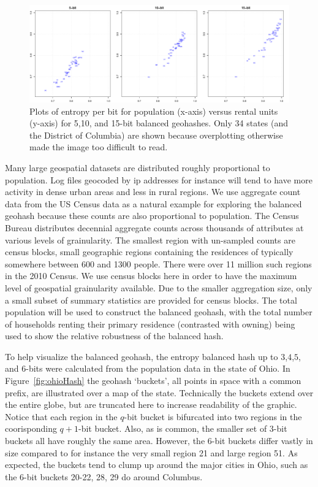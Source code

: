 \documentclass[nips13submit_09,times,art10]{article} %
\begin{document}
\begin{figure}
\centering
\includegraphics[width=6in]{fig04}
\caption{Plots of entropy per bit for population (x-axis) versus rental units (y-axis)
for 5,10, and 15-bit balanced geohashes. Only 34 states (and the District of Columbia)
are shown because overplotting otherwise made the image too difficult to read.}
 \label{fig:allStatesEntropy}
\end{figure}

Many large geospatial datasets are distributed roughly proportional to population. Log files
geocoded by ip addresses for instance will tend to have more activity in dense urban areas
and less in rural regions. We use aggregate count data from the US Census data as a natural
example for exploring the balanced geohash because these counts are also proportional to
population. The Census Bureau distributes decennial aggregate counts across thousands of
attributes at various levels of grainularity. The smallest region with un-sampled counts are
census blocks, small geographic regions containing the residences of typically somewhere
between 600 and 1300 people. There were over 11 million such regions in the 2010 Census. We
use census blocks here in order to have the maximum level of geospatial grainularity available.
Due to the smaller aggregation size, only a small subset of summary statistics are provided
for census blocks. The total population will be used to construct the balanced geohash, with
the total number of households renting their primary residence (contrasted with owning) being
used to show the relative robustness of the balanced hash.

To help visualize the balanced geohash, the entropy balanced hash up to $3$,$4$,$5$, and
$6$-bits were calculated from the population data in the state of Ohio. In Figure~\ref{fig:ohioHash}
the geohash `buckets', all points in space with a common prefix, are illustrated over a
map of the state. Technically the buckets extend over the entire globe, but are truncated here
to increase readability of the graphic. Notice that each region in the $q$-bit bucket is bifurcated
into two regions in the coorisponding $q+1$-bit bucket. Also, as is common, the smaller set of
$3$-bit buckets all have roughly the same area. However, the $6$-bit buckets differ vastly in size
compared to for instance the very small region 21 and large region 51. As expected, the buckets
tend to clump up around the major cities in Ohio, such as the $6$-bit buckets 20-22, 28, 29
do around Columbus.
\end{document}
